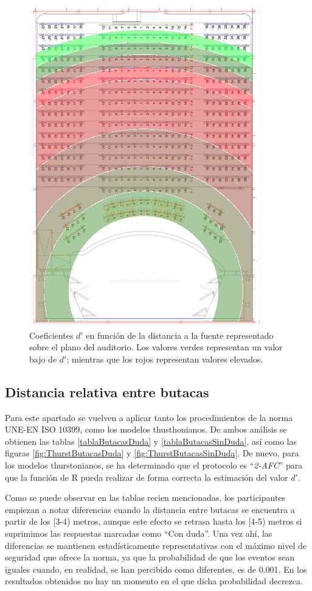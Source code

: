 \documentclass[11pt,a4paper,twoside]{book}
\begin{document}
            \begin{figure}[H]
                \includegraphics[scale=0.9]{../imagenes/auditoriodprime.png}
			    \centering
			    \caption{Coeficientes $d'$ en función de la distancia a la fuente representado sobre el plano del auditorio. Los valores verdes representan un valor bajo de $d'$; mientras que los rojos representan valores elevados.} 
			    \label{fig:dprimeauditorio}
            \end{figure}
        
        \subsection{Distancia relativa entre butacas}
            Para este apartado se vuelven a aplicar tanto los procedimientos de la norma UNE-EN ISO 10399, como los modelos thusthonianos. De ambos análisis se obtienen las tablas \ref{tablaButacasDuda} y \ref{tablaButacasSinDuda}, así como las figuras \ref{fig:ThurstButacasDuda} y \ref{fig:ThurstButacasSinDuda}. De nuevo, para los modelos thurstonianos, se ha determinado que el protocolo es ``\textit{2-AFC}'' para que la función de R pueda realizar de forma correcta la estimación del valor $d'$.
            
            Como se puede observar en las tablas recien mencionadas, los participantes empiezan a notar diferencias cuando la distancia entre butacas se encuentra a partir de los [3-4) metros, aunque este efecto se retrasa hasta los [4-5) metros si suprimimos las respuestas marcadas como ``Con duda''. Una vez ahí, las diferencias se mantienen estadísticamente representativas con el máximo nivel de seguridad que ofrece la norma, ya que la probabilidad de que los eventos sean iguales cuando, en realidad, se han percibido como diferentes, es de 0.001. En los resultados obtenidos no hay un momento en el que dicha probabilidad decrezca.
            
\end{document}
